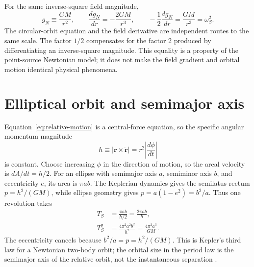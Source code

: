 \documentclass[12pt]{article}
\begin{document}
For the same inverse-square field magnitude,
\begin{equation}
  g_N\equiv\frac{GM}{r^2},
  \qquad
  \frac{dg_N}{dr}=-\frac{2GM}{r^3},
  \qquad
  -\frac{1}{2}\frac{dg_N}{dr}=\frac{GM}{r^3}=\omega_S^2.
  \label{eq:field-gradient}
\end{equation}
The circular-orbit equation and the field derivative are independent routes to the same scale. The factor $1/2$ compensates for the factor $2$ produced by differentiating an inverse-square magnitude. This equality is a property of the point-source Newtonian model; it does not make the field gradient and orbital motion identical physical phenomena.

\section{Elliptical orbit and semimajor axis}
\label{sec:ellipse}

Equation~\eqref{eq:relative-motion} is a central-force equation, so the specific angular momentum magnitude
\begin{equation}
  h\equiv|\boldsymbol r\times\dot{\boldsymbol r}|=r^2\left|\frac{d\phi}{dt}\right|
  \label{eq:angular-momentum}
\end{equation}
is constant. Choose increasing $\phi$ in the direction of motion, so the areal velocity is $dA/dt=h/2$. For an ellipse with semimajor axis $a$, semiminor axis $b$, and eccentricity $e$, its area is $\pi ab$. The Keplerian dynamics gives the semilatus rectum $p=h^2/(GM)$, while ellipse geometry gives $p=a(1-e^2)=b^2/a$. Thus one revolution takes
\begin{align}
  T_S
  &=\frac{\pi ab}{h/2}
   =\frac{2\pi ab}{h},\\
  T_S^2
  &=\frac{4\pi^2a^2b^2}{h^2}
   =\frac{4\pi^2a^3}{GM}.
  \label{eq:ellipse-period}
\end{align}
The eccentricity cancels because $b^2/a=p=h^2/(GM)$. This is Kepler's third law for a Newtonian two-body orbit; the orbital size in the period law is the semimajor axis of the relative orbit, not the instantaneous separation \cite{OpenStaxKepler}.
\end{document}
